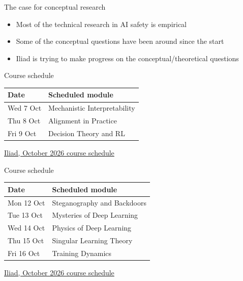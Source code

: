 \documentclass[aspectratio=169,11pt]{beamer}
\newcommand{\sources}[1]{\vfill{\fontsize{6.3}{7.5}\selectfont\color{muted}#1\par}}
\begin{document}
\begin{frame}[t,label=mapoverview]{The case for conceptual research}
\begin{itemize}\setlength{\itemsep}{3.5mm}
\item Most of the technical research in AI safety is empirical
\item Some of the conceptual questions have been around since the start
\item Iliad is trying to make progress on the conceptual/theoretical questions
\end{itemize}
\end{frame}


\begin{frame}[t,label=course1]{Course schedule}
\normalsize\renewcommand{\arraystretch}{1.38}\setlength{\tabcolsep}{3pt}
\begin{tabular}{@{}>{\raggedright\arraybackslash}p{}>{\raggedright\arraybackslash}p{}@{}}\toprule
\textbf{Date} & \textbf{Scheduled module}\\\midrule
Wed 7 Oct & Mechanistic Interpretability\\
Thu 8 Oct & Alignment in Practice\\
Fri 9 Oct & Decision Theory and RL\\
\bottomrule\end{tabular}
\sources{\href{https://iliad-teachers.pages.dev/schedule}{Iliad, October 2026 course schedule}}
\end{frame}


\begin{frame}[t,label=course2]{Course schedule}
\small\renewcommand{\arraystretch}{1.38}\setlength{\tabcolsep}{3pt}
\begin{tabular}{@{}>{\raggedright\arraybackslash}p{}>{\raggedright\arraybackslash}p{}@{}}\toprule
\textbf{Date} & \textbf{Scheduled module}\\\midrule
Mon 12 Oct & Steganography and Backdoors\\
Tue 13 Oct & Mysteries of Deep Learning\\
Wed 14 Oct & Physics of Deep Learning\\
Thu 15 Oct & Singular Learning Theory\\
Fri 16 Oct & Training Dynamics\\
\bottomrule\end{tabular}
\sources{\href{https://iliad-teachers.pages.dev/schedule}{Iliad, October 2026 course schedule}}
\end{frame}
\end{document}
